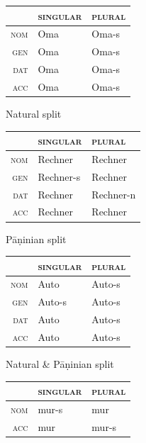\documentclass[output=paper
                ,modfonts
                ,nonflat
	        ,collection
	        ,collectionchapter
	        ,collectiontoclongg
 	        ,biblatex
                ,babelshorthands
                ,newtxmath
                ,draftmode
                ,colorlinks, citecolor=brown
] {langscibook}
\begin{document}
{\begin{table}[htb]
  \centering
  
  \begin{subfigure}{.45\textwidth}
    \begin{tabular}{r|ll}
      \toprule
      & \textsc{singular} & \textsc{plural}\\
      \midrule
      \textsc{nom} & Oma & Oma-s\\
      \textsc{gen} & Oma & Oma-s\\
      \textsc{dat} & Oma & Oma-s\\
      \textsc{acc} & Oma & Oma-s\\
      \bottomrule
    \end{tabular}

    \caption{Natural split}
  \end{subfigure}  
  \begin{subfigure}{.45\textwidth}
    \begin{tabular}{r|ll}
      \toprule
      & \textsc{singular} & \textsc{plural}\\
      \midrule
      \textsc{nom} & Rechner & Rechner\\
      \textsc{gen} & Rechner-s & Rechner\\
      \textsc{dat} & Rechner & Rechner-n\\
      \textsc{acc} & Rechner & Rechner\\
      \bottomrule
    \end{tabular}
    \caption{Pāṇinian split}
  \end{subfigure}

  \begin{subfigure}{.45\textwidth}
      \begin{tabular}{r|ll}
        \toprule
        & \textsc{singular} & \textsc{plural}\\
        \midrule
        \textsc{nom} & Auto & Auto-s\\
        \textsc{gen} & Auto-s & Auto-s\\
        \textsc{dat} & Auto & Auto-s\\
        \textsc{acc} & Auto & Auto-s\\
        \bottomrule
      \end{tabular}
      \caption{Natural \& Pāṇinian split}
    \end{subfigure}
  \begin{subfigure}{.45\textwidth}
    \begin{tabular}{r|ll}
      \toprule
      & \textsc{singular} & \textsc{plural}\\
      \midrule
      \textsc{nom} & mur-s & mur\\
      \textsc{acc} & mur & mur-s\\
      \bottomrule
    \end{tabular}


\end{subfigure}
\end{table}}
\end{document}
